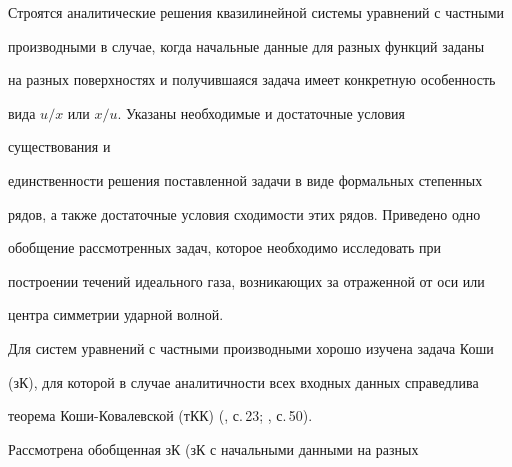 \date{}







\pagestyle{plain} %













\maketitle













Строятся аналитические решения квазилинейной системы уравнений с частными


производными в случае, когда начальные данные для разных функций заданы


на разных поверхностях и получившаяся задача имеет конкретную особенность


вида $u/x$ или $x/u$. Указаны необходимые и достаточные условия


существования и


единственности решения поставленной задачи в виде формальных степенных


рядов, а также достаточные условия сходимости этих рядов. Приведено одно


обобщение рассмотренных задач, которое необходимо исследовать при


построении течений идеального газа, возникающих за отраженной от оси или


центра симметрии ударной волной.





Для систем уравнений с частными производными хорошо изучена задача Коши


(зК), для которой в случае аналитичности всех входных данных справедлива


теорема Коши-Ковалевской (тКК) (\cite{1}, с.\,23; \cite{2}, с.\,50).


Рассмотрена обобщенная зК (зК с начальными данными на разных


